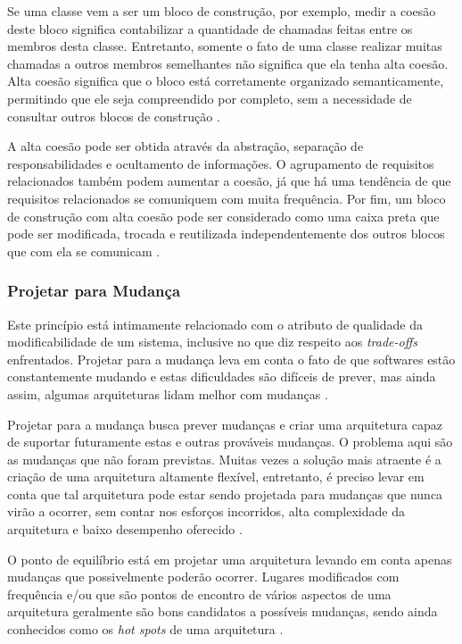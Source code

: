 \documentclass[diss]{template/setrem}
\begin{document}
Se uma classe vem a ser um bloco de construção, por exemplo, medir a coesão deste bloco significa contabilizar a quantidade de chamadas feitas entre os membros desta classe. Entretanto, somente o fato de uma classe realizar muitas chamadas a outros membros semelhantes não significa que ela tenha alta coesão. Alta coesão significa que o bloco está corretamente organizado semanticamente, permitindo que ele seja compreendido por completo, sem a necessidade de consultar outros blocos de construção \citep{Vogel2011}.

A alta coesão pode ser obtida através da abstração, separação de responsabilidades e ocultamento de informações. O agrupamento de requisitos relacionados também podem aumentar a coesão, já que há uma tendência de que requisitos relacionados se comuniquem com muita frequência. Por fim, um bloco de construção com alta coesão pode ser considerado como uma caixa preta que pode ser modificada, trocada e reutilizada independentemente dos outros blocos que com ela se comunicam \citep{Vogel2011}.

\subsubsection{Projetar para Mudança}
Este princípio está intimamente relacionado com o atributo de qualidade da modificabilidade de um sistema, inclusive no que diz respeito aos \emph{trade-offs} enfrentados. Projetar para a mudança leva em conta o fato de que softwares estão constantemente mudando e estas dificuldades são difíceis de prever, mas ainda assim, algumas arquiteturas lidam melhor com mudanças \citep{Vogel2011}.

Projetar para a mudança busca prever mudanças e criar uma arquitetura capaz de suportar futuramente estas e outras prováveis mudanças. O problema aqui são as mudanças que não foram previstas. Muitas vezes a solução mais atraente é a criação de uma arquitetura altamente flexível, entretanto, é preciso levar em conta que tal arquitetura pode estar sendo projetada para mudanças que nunca virão a ocorrer, sem contar nos esforços incorridos, alta complexidade da arquitetura e baixo desempenho oferecido \citep{Vogel2011}.

O ponto de equilíbrio está em projetar uma arquitetura levando em conta apenas mudanças que possivelmente poderão ocorrer. Lugares modificados com frequência e/ou que são pontos de encontro de vários aspectos de uma arquitetura geralmente são bons candidatos a possíveis mudanças, sendo ainda conhecidos como os \emph{hot spots} de uma arquitetura \citep{Vogel2011}.
\end{document}
